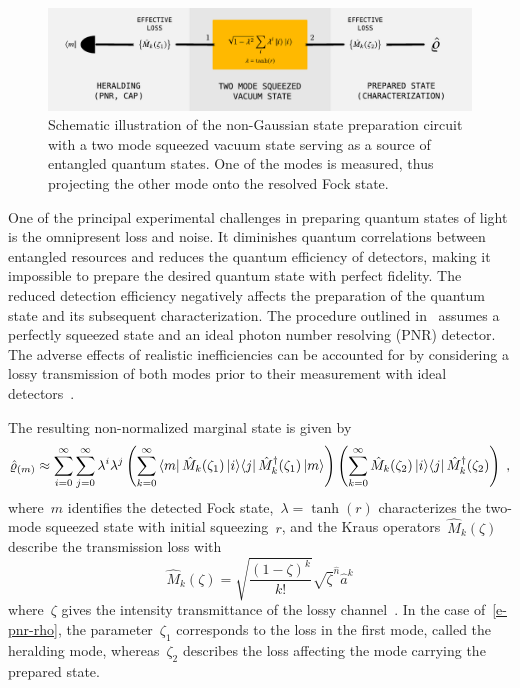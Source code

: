 \documentclass{article}
\begin{document}
\begin{figure}[h]
  \begin{center}
    \includegraphics[width = 1.00 \columnwidth]{import/illustrate_scheme_alt.pdf}
  \end{center}
  \caption{
    Schematic illustration of the non-Gaussian state preparation circuit with a two mode squeezed vacuum state serving as a source of entangled quantum states. One of the modes is measured, thus projecting the other mode onto the resolved Fock state. 
  }
  \label{f-scheme}
\end{figure}

One of the principal experimental challenges in preparing quantum states of light is the omnipresent loss and noise. It diminishes quantum correlations between entangled resources and reduces the quantum efficiency of detectors, making it impossible to prepare the desired quantum state with perfect fidelity. The reduced detection efficiency negatively affects the preparation of the quantum state and its subsequent characterization. The procedure outlined in~ assumes a perfectly squeezed state and an ideal photon number resolving (PNR) detector. The adverse effects of realistic inefficiencies can be accounted for by considering a lossy transmission of both modes prior to their measurement with ideal detectors~\cite{feito2009}.

The resulting non-normalized marginal state is given by
%
\begin{equation}\label{e-pnr-rho}
  \hatrho_{(m)} \approx
  \sum_{i = 0}^{\infty} 
  \sum_{j = 0}^{\infty}
    \lambda^{i} \lambda^{j}
    \left(
      \sum_{k = 0}^{\infty}
        \bra{m} \hat{M}_{k} (\zeta_{1}) \ketbra{i}{j} \hat{M}_{k}^{\dagger} (\zeta_{1}) \ket{m}
    \right)
    \left(
      \sum_{k = 0}^{\infty}
        \hat{M}_{k}(\zeta_{2}) \ketbra{i}{j} \hat{M}_{k}^{\dagger} (\zeta_{2})
    \right) \Qc
\end{equation}
%
where~$m$ identifies the detected Fock state,~${\lambda = \tanh(r)}$ characterizes the two-mode squeezed state with initial squeezing~$r$, and the Kraus operators~${\hat{M}_{k} (\zeta)}$ describe the transmission loss with
%
\begin{equation}
  \hat{M}_{k} (\zeta) =
    \sqrt{ \frac{(1 - \zeta)^{k}}{k!} } 
    \sqrt{\zeta}^{\hat{n}} \hat{a}^{k}
\end{equation}
%
where~$\zeta$ gives the intensity transmittance of the lossy channel~\cite{ivan2011}. In the case of~\eqref{e-pnr-rho}, the parameter~$\zeta_{1}$ corresponds to the loss in the first mode, called the heralding mode, whereas~$\zeta_{2}$ describes the loss affecting the mode carrying the prepared state.
\end{document}
